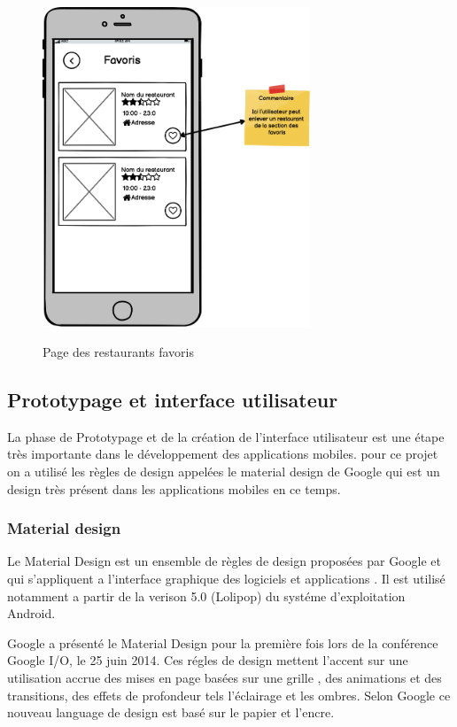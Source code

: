 \begin{figure}[!h]
    \centering
    \includegraphics[width=8cm]{images/Chapitre3/maquettes_balsamiq/favorite_restaurants.png}
    \label{fig:favoris}
    \caption{Page des restaurants favoris}
\end{figure} 
\newpage
\subsection{Prototypage et interface utilisateur}
La phase de Prototypage et de la création de l'interface utilisateur est une étape très importante dans le développement des applications mobiles. pour ce projet on a utilisé les règles de design appelées le material design de Google qui est un design très présent dans les applications mobiles en ce temps.
\subsubsection{Material design}
Le Material Design est un ensemble de règles de design proposées par Google et qui s'appliquent a l'interface graphique 
des logiciels et applications . Il est utilisé notamment a partir de la verison 5.0 (Lolipop) du systéme d'exploitation 
Android.

Google a présenté le Material Design pour la première fois lors de la conférence Google I/O, le 25 juin 2014. Ces régles 
de design mettent l'accent sur une utilisation accrue des mises en page basées sur une grille , des animations et des
transitions, des effets de profondeur tels l'éclairage et les ombres. Selon Google ce nouveau language de design est basé 
sur le papier et l'encre.

